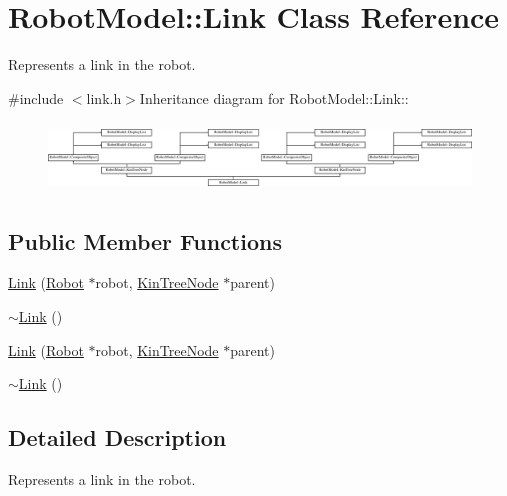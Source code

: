 \hypertarget{class_robot_model_1_1_link}{
\section{RobotModel::Link Class Reference}
\label{class_robot_model_1_1_link}
}


Represents a link in the robot.  


{\ttfamily \#include $<$link.h$>$}Inheritance diagram for RobotModel::Link::\begin{figure}[H]
\begin{center}
\leavevmode
\includegraphics[height=1.8617cm]{class_robot_model_1_1_link}
\end{center}
\end{figure}
\subsection*{Public Member Functions}
\begin{DoxyCompactItemize}
\item 
\hyperlink{class_robot_model_1_1_link_adf46ff7e38787594ac9941a478083f21}{Link} (\hyperlink{class_robot_model_1_1_robot}{Robot} $\ast$robot, \hyperlink{class_robot_model_1_1_kin_tree_node}{KinTreeNode} $\ast$parent)
\item 
\hyperlink{class_robot_model_1_1_link_a666e442abb3122fe5eb1705f1b2d650d}{$\sim$Link} ()
\item 
\hyperlink{class_robot_model_1_1_link_a51f1c1b6b739dac1ecdff9e803db2499}{Link} (\hyperlink{class_robot_model_1_1_robot}{Robot} $\ast$robot, \hyperlink{class_robot_model_1_1_kin_tree_node}{KinTreeNode} $\ast$parent)
\item 
\hyperlink{class_robot_model_1_1_link_a8d7151624da1aa2dc7675ab63ec29a1c}{$\sim$Link} ()
\end{DoxyCompactItemize}


\subsection{Detailed Description}
Represents a link in the robot. 

